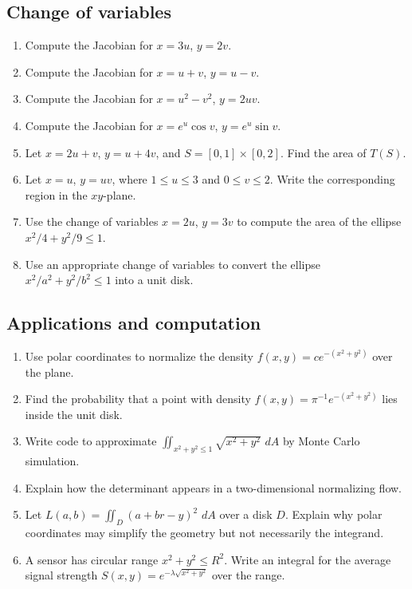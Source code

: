 \documentclass[11pt]{article}
\newcommand{\dd}{\,d}
\begin{document}
\subsection*{Change of variables}
\begin{enumerate}[start=27]
  \item Compute the Jacobian for $x=3u$, $y=2v$.
  \item Compute the Jacobian for $x=u+v$, $y=u-v$.
  \item Compute the Jacobian for $x=u^2-v^2$, $y=2uv$.
  \item Compute the Jacobian for $x=e^u\cos v$, $y=e^u\sin v$.
  \item Let $x=2u+v$, $y=u+4v$, and $S=[0,1]\times[0,2]$. Find the area of $T(S)$.
  \item Let $x=u$, $y=uv$, where $1\le u\le3$ and $0\le v\le2$. Write the corresponding region in the $xy$-plane.
  \item Use the change of variables $x=2u$, $y=3v$ to compute the area of the ellipse $x^2/4+y^2/9\le1$.
  \item Use an appropriate change of variables to convert the ellipse $x^2/a^2+y^2/b^2\le1$ into a unit disk.
\end{enumerate}

\subsection*{Applications and computation}
\begin{enumerate}[start=35]
  \item Use polar coordinates to normalize the density $f(x,y)=ce^{-(x^2+y^2)}$ over the plane.
  \item Find the probability that a point with density $f(x,y)=\pi^{-1}e^{-(x^2+y^2)}$ lies inside the unit disk.
  \item Write code to approximate $\iint_{x^2+y^2\le1}\sqrt{x^2+y^2}\,\dd A$ by Monte Carlo simulation.
  \item Explain how the determinant appears in a two-dimensional normalizing flow.
  \item Let $L(a,b)=\iint_D(a+br-y)^2\,\dd A$ over a disk $D$. Explain why polar coordinates may simplify the geometry but not necessarily the integrand.
  \item A sensor has circular range $x^2+y^2\le R^2$. Write an integral for the average signal strength $S(x,y)=e^{-\lambda\sqrt{x^2+y^2}}$ over the range.
\end{enumerate}
\end{document}
